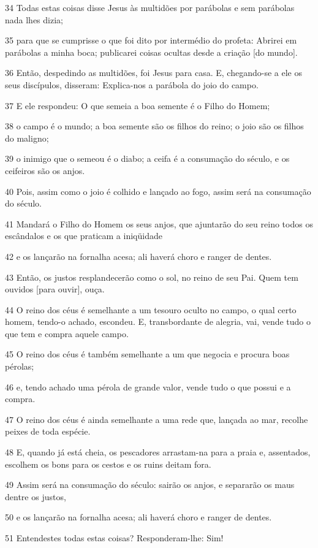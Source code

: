 \par 34 Todas estas coisas disse Jesus às multidões por parábolas e sem parábolas nada lhes dizia;
\par 35 para que se cumprisse o que foi dito por intermédio do profeta: Abrirei em parábolas a minha boca; publicarei coisas ocultas desde a criação [do mundo].
\par 36 Então, despedindo as multidões, foi Jesus para casa. E, chegando-se a ele os seus discípulos, disseram: Explica-nos a parábola do joio do campo.
\par 37 E ele respondeu: O que semeia a boa semente é o Filho do Homem;
\par 38 o campo é o mundo; a boa semente são os filhos do reino; o joio são os filhos do maligno;
\par 39 o inimigo que o semeou é o diabo; a ceifa é a consumação do século, e os ceifeiros são os anjos.
\par 40 Pois, assim como o joio é colhido e lançado ao fogo, assim será na consumação do século.
\par 41 Mandará o Filho do Homem os seus anjos, que ajuntarão do seu reino todos os escândalos e os que praticam a iniqüidade
\par 42 e os lançarão na fornalha acesa; ali haverá choro e ranger de dentes.
\par 43 Então, os justos resplandecerão como o sol, no reino de seu Pai. Quem tem ouvidos [para ouvir], ouça.
\par 44 O reino dos céus é semelhante a um tesouro oculto no campo, o qual certo homem, tendo-o achado, escondeu. E, transbordante de alegria, vai, vende tudo o que tem e compra aquele campo.
\par 45 O reino dos céus é também semelhante a um que negocia e procura boas pérolas;
\par 46 e, tendo achado uma pérola de grande valor, vende tudo o que possui e a compra.
\par 47 O reino dos céus é ainda semelhante a uma rede que, lançada ao mar, recolhe peixes de toda espécie.
\par 48 E, quando já está cheia, os pescadores arrastam-na para a praia e, assentados, escolhem os bons para os cestos e os ruins deitam fora.
\par 49 Assim será na consumação do século: sairão os anjos, e separarão os maus dentre os justos,
\par 50 e os lançarão na fornalha acesa; ali haverá choro e ranger de dentes.
\par 51 Entendestes todas estas coisas? Responderam-lhe: Sim!
